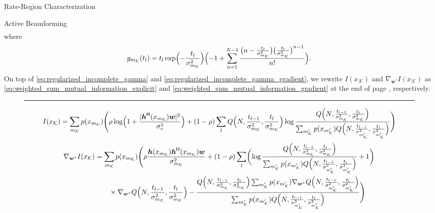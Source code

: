 \documentclass[journal]{IEEEtran}
\begin{document}
\begin{section}{Rate-Region Characterization}
\begin{subsection}{Active Beamforming}
\begin{align}
		\end{align}
		where
		\begin{equation}
			g_{m_{\mathcal{K}}}(t_l) = t_l\exp\Bigl(-\frac{t_l}{\sigma_{m_{\mathcal{K}}}^2}\Bigr)\Bigl(-1+\sum_{n=1}^{N-1} \frac{\bigl(n - \frac{t_l}{\sigma_{m_{\mathcal{K}}}^2}\bigr) \bigl(\frac{t_l}{\sigma_{m_{\mathcal{K}}}^2}\bigr)^{n-1}}{n!}\Bigr).
			\label{eq:regularized_incomplete_gamma_gradient_component}
		\end{equation}
		On top of \eqref{eq:regularized_incomplete_gamma} and \eqref{eq:regularized_incomplete_gamma_gradient}, we rewrite $I(x_{\mathcal{K}})$ and $\nabla_{\boldsymbol{w}^*} I(x_{\mathcal{K}})$ as \eqref{eq:weighted_sum_mutual_information_explicit} and \eqref{eq:weighted_sum_mutual_information_gradient} at the end of page \pageref{eq:weighted_sum_mutual_information_explicit}, respectively.
		\begin{figure*}[!b]
			\hrule
			\begin{equation}
				I(x_{\mathcal{K}})=\sum_{m_{\mathcal{K}}}p(x_{m_{\mathcal{K}}})\Biggl(\rho\log\Bigl(1+\frac{\lvert\boldsymbol{h}^\mathsf{H}(x_{m_{\mathcal{K}}})\boldsymbol{w}\rvert^2}{\sigma_v^2}\Bigr)+(1-\rho)\sum_l Q\Bigl(N,\frac{t_{l-1}}{\sigma_{m_{\mathcal{K}}}^2},\frac{t_l}{\sigma_{m_{\mathcal{K}}}^2}\Bigr) \log \frac{Q\Bigl(N,\frac{t_{l-1}}{\sigma_{m_{\mathcal{K}}}^2},\frac{t_l}{\sigma_{m_{\mathcal{K}}}^2}\Bigr)}{\sum_{m_{\mathcal{K}}'} p(x_{m_{\mathcal{K}}'}) Q\Bigl(N,\frac{t_{l-1}}{\sigma_{m_{\mathcal{K}}'}^2},\frac{t_l}{\sigma_{m_{\mathcal{K}}'}^2}\Bigr)}\Biggr)
				\label{eq:weighted_sum_mutual_information_explicit}
			\end{equation}
			\begin{align}
				\nabla_{\boldsymbol{w}^*} I(x_{\mathcal{K}})
				 & = \sum_{m_{\mathcal{K}}}p(x_{m_{\mathcal{K}}})\Biggl(\rho\frac{\boldsymbol{h}(x_{m_{\mathcal{K}}})\boldsymbol{h}^\mathsf{H}(x_{m_{\mathcal{K}}})\boldsymbol{w}}{\sigma_{m_{\mathcal{K}}}^2}+(1-\rho)\sum_l\biggl(\log\frac{Q\Bigl(N,\frac{t_{l-1}}{\sigma_{m_{\mathcal{K}}}^2},\frac{t_l}{\sigma_{m_{\mathcal{K}}}^2}\Bigr)}{\sum_{m_{\mathcal{K}}'}p(x_{m_{\mathcal{K}}'})Q\Bigl(N,\frac{t_{l-1}}{\sigma_{m_{\mathcal{K}}'}^2},\frac{t_l}{\sigma_{m_{\mathcal{K}}'}^2}\Bigr)}+1\biggr)\nonumber                                                                                   \\
				 & \qquad \times \nabla_{\boldsymbol{w}^*} Q\Bigl(N,\frac{t_{l-1}}{\sigma_{m_{\mathcal{K}}}^2},\frac{t_l}{\sigma_{m_{\mathcal{K}}}^2}\Bigr)-\frac{Q\Bigl(N,\frac{t_{l-1}}{\sigma_{m_{\mathcal{K}}}^2},\frac{t_l}{\sigma_{m_{\mathcal{K}}}^2}\Bigr)\sum_{m_{\mathcal{K}}'}p(x_{m_{\mathcal{K}}'})\nabla_{\boldsymbol{w}^*}Q\Bigl(N,\frac{t_{l-1}}{\sigma_{m_{\mathcal{K}}'}^2},\frac{t_l}{\sigma_{m_{\mathcal{K}}'}^2}\Bigr)}{\sum_{m_{\mathcal{K}}'}p(x_{m_{\mathcal{K}}'})Q\Bigl(N,\frac{t_{l-1}}{\sigma_{m_{\mathcal{K}}'}^2},\frac{t_l}{\sigma_{m_{\mathcal{K}}'}^2}\Bigr)}\Biggr)

\end{align}
\end{figure*}
\end{subsection}
\end{section}
\end{document}

